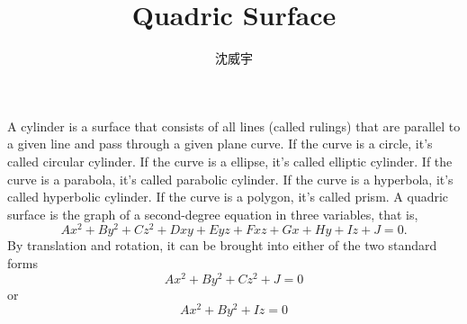 \documentclass[a4paper,12pt]{article}
\begin{document}
\title{Quadric Surface}
\author{沈威宇}
\date{\temtoday}
\titletocdoc
{}
A cylinder is a surface that consists of all lines (called rulings) that are parallel to a given line and pass through a given plane curve. If the curve is a circle, it's called circular cylinder. If the curve is a ellipse, it's called elliptic cylinder. If the curve is a parabola, it's called parabolic cylinder. If the curve is a hyperbola, it's called hyperbolic cylinder. If the curve is a polygon, it's called prism.
A quadric surface is the graph of a second-degree equation in three variables, that is,
\[Ax^2+By^2+Cz^2+Dxy+Eyz+Fxz+Gx+Hy+Iz+J=0.\]
By translation and rotation, it can be brought into either of the two standard forms
\[Ax^2+By^2+Cz^2+J=0\]
or
\[Ax^2+By^2+Iz=0\]
\end{document}

